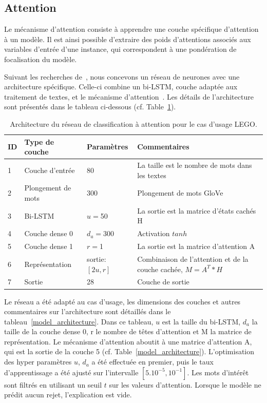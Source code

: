 \subsection{Attention} \label{C2:attention}

Le mécanisme d'attention consiste à apprendre une couche spécifique d'attention à un modèle. Il est ainsi possible d'extraire des poids d'attentions associés aux variables d'entrée d'une instance, qui correspondent à une pondération de focalisation du modèle.

Suivant les recherches de~\cite{Lin2017}, nous concevons un réseau de neurones avec une architecture spécifique. Celle-ci combine un bi-LSTM, couche adaptée aux traitement de textes, et le mécanisme d'attention~\cite{Lin2017}. Les détails de l'architecture sont présentés dans le tableau ci-dessous (cf. Table~\ref{tab:model_architecture}).

\begin{table}[htb!p]
\caption{Architecture du réseau de classification à attention pour le cas d'usage LEGO.}\label{tab:model_architecture}
\begin{tabular}{|l|p{}|p{}|p{}|}
\hline
\textbf{ID} & \textbf{Type de couche} & \textbf{Paramètres} & \textbf{Commentaires} \\ \hline
1 & Couche d'entrée    & 80               & La taille est le nombre de mots dans les textes \\ \hline
2 & Plongement de mots & 300              & Plongement de mots GloVe\\ \hline
3 & Bi-LSTM            & $u=$50           & La sortie est la matrice d'états cachés H \\ \hline
4 & Couche dense 0     & $d_a=$300        & Activation $tanh$ \\ \hline
5 & Couche dense 1     & $r=$1            & La sortie est la matrice d'attention A\\ \hline
6 & Représentation     & sortie: $[2u,r]$ & Combinaison de l'attention et de la couche cachée, $M=A^T*H$ \\ \hline
7 & Sortie             &  28              & Couche de sortie \\ \hline
\end{tabular}
\end{table}

Le réseau a été adapté au cas d'usage, les dimensions des couches et autres commentaires sur l'architecture sont détaillés dans le tableau~\ref{model_architecture}. Dans ce tableau, $u$ est la taille du bi-LSTM, $d_a$ la taille de la couche dense 0, r le nombre de têtes d'attention et M la matrice de représentation. Le mécanisme d'attention aboutit à une matrice d'attention A, qui est la sortie de la couche 5 (cf. Table~\ref{model_architecture}).
L'optimisation des hyper paramètres $u$, $d_a$ a été effectuée en premier, puis le taux d'apprentissage a été ajusté sur l'intervalle $[5.10^{-5},10^{-1}]$.
Les mots d'intérêt sont filtrés en utilisant un seuil $t$ sur les valeurs d'attention. Lorsque le modèle ne prédit aucun rejet, l'explication est vide.


